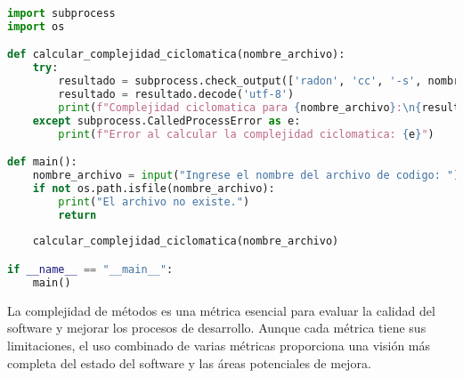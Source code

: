 \documentclass[a4,10pt]{article}
\begin{document}
\begin{lstlisting}[language=Python, caption=Ejemplo de código en Python para calcular la Complejidad Ciclomática]
import subprocess
import os

def calcular_complejidad_ciclomatica(nombre_archivo):
    try:
        resultado = subprocess.check_output(['radon', 'cc', '-s', nombre_archivo])
        resultado = resultado.decode('utf-8')
        print(f"Complejidad ciclomatica para {nombre_archivo}:\n{resultado}")
    except subprocess.CalledProcessError as e:
        print(f"Error al calcular la complejidad ciclomatica: {e}")

def main():
    nombre_archivo = input("Ingrese el nombre del archivo de codigo: ")
    if not os.path.isfile(nombre_archivo):
        print("El archivo no existe.")
        return
    
    calcular_complejidad_ciclomatica(nombre_archivo)

if __name__ == "__main__":
    main()
\end{lstlisting}

La complejidad de métodos es una métrica esencial para evaluar la calidad del software y mejorar los procesos de desarrollo. Aunque cada métrica tiene sus limitaciones, el uso combinado de varias métricas proporciona una visión más completa del estado del software y las áreas potenciales de mejora.

\printbibliography
\end{document}
